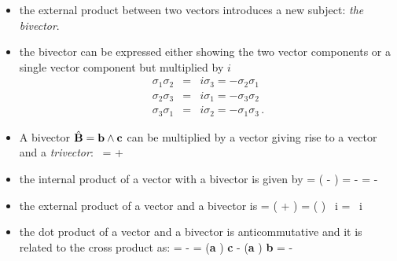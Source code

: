 \documentclass[10pt]{beamer}
\begin{document}
\begin{frame}[fragile]{}
\begin{itemize}
\item the external product between two vectors introduces a new subject:  \emph{the bivector}.
\item the bivector can be expressed either showing the two vector components or a single vector component but multiplied by $i$ 
%
\begin {eqnarray}
\sigma_1 \sigma_2 &=& i \sigma_3  = - \sigma_2 \sigma_1 \nonumber \\
\sigma_2 \sigma_3 &=& i \sigma_1 =  - \sigma_3  \sigma_2\nonumber \\
\sigma_3 \sigma_1 &=&  i \sigma_2 =  - \sigma_1  \sigma_3 \,.
\label{sigmacomb}
 \end{eqnarray}
\item 
A bivector $\hat{\mathbf{B}} = \mathbf{b} \wedge \mathbf{c}$ can be multiplied by a vector giving rise to a vector and a \emph{trivector}:
\be \label{aB}
\Ba \, \hat{\BB} = \Ba \cdot \hat{\BB} + \Ba \wedge \hat{\BB}
\ee
\end{itemize}

\end{frame}


\begin{frame}[fragile]{}
\begin{itemize}

\item the internal product of a vector with a bivector is given by
\be 
\Ba \cdot \hat{\BB}  =  \left(\Ba \hat{\BB} - \hat{\BB} \Ba \right) = - \Ba \times \Bb \times \Bc = - \Ba \times \BB
\ee
\item the external product of a vector and a bivector is
%
\be 
\Ba \wedge \hat{\BB}  =  \left(\Ba \hat{\BB} + \hat{\BB} \Ba \right) =  \Ba \cdot \left( \Bb \times \Bc\right) \,  i  =  \Ba \cdot  \BB  \,  i 
\ee

\item the dot product of a vector and a bivector is anticommutative and it is related to the cross product as:
\be \label{adbwcatbtccs}
\Ba \cdot \Bb \wedge \Bc = - \Ba \times \Bb \times \Bc = ({\bf a}  )    {\bf c} - ({\bf a}  )  {\bf b} = -\Bb \wedge \Bc \cdot \Ba
\ee

\end{itemize}

\end{frame}
\end{document}
